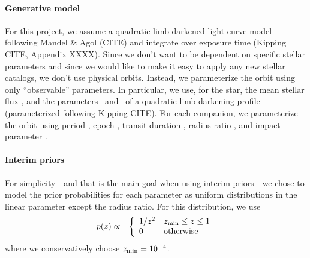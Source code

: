 \documentclass[12pt,preprint]{aastex}
\begin{document}
\paragraph{Generative model}
For this project, we assume a quadratic limb darkened light curve model
following Mandel \& Agol (CITE) and integrate over exposure time (Kipping
CITE, Appendix XXXX).
Since we don't want to be dependent on specific stellar parameters and since
we would like to make it easy to apply any new stellar catalogs, we don't use
physical orbits.
Instead, we parameterize the orbit using only ``observable'' parameters.
In particular, we use, for the star, the mean stellar flux \fstar, and the
parameters \qone\ and \qtwo\ of a quadratic limb darkening profile
(parameterized following Kipping CITE).
For each companion, we parameterize the orbit using period \period, epoch
\epoch, transit duration \duration, radius ratio \ror, and impact parameter
\impact.

\paragraph{Interim priors}
For simplicity---and that is the main goal when using interim priors---we
chose to model the prior probabilities for each parameter as uniform
distributions in the linear parameter except the radius ratio.
For this distribution, we use
\begin{eqnarray}
p(z) &\propto& \left \{ \begin{array}{ll}
1/z^2 & z_\mathrm{min} \le z \le 1 \\
0 & \mathrm{otherwise} \\
\end{array}\right.
\end{eqnarray}
where we conservatively choose $z_\mathrm{min} = 10^{-4}$.
\end{document}
